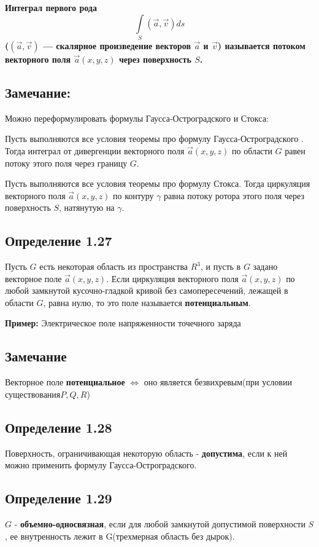 \documentclass[12pt]{article}
\begin{document}
\textbf{Интеграл первого рода}
	$$\int\limits_{S} (\vec{a} , \vec{v})ds$$
\textbf{($(\vec{a} , \vec{v})$ — скалярное произведение векторов $\vec{a}$ и $\vec{v}$) называется потоком векторного поля $\vec{a}(x, y, z)$ через поверхность $S$.}

\subsection*{Замечание:}
	Можно переформулировать формулы Гаусса-Остроградского и Стокса:
	
	Пусть выполняются все условия теоремы про формулу Гаусса-Остроградского . Тогда интеграл от дивергенции векторного поля $\vec{a}(x, y, z)$ по области $G$ равен потоку этого поля через границу $G$.


	Пусть выполняются все условия теоремы про формулу Стокса. Тогда циркуляция векторного поля $\vec{a}(x, y, z)$ по контуру $\gamma$ равна потоку ротора этого поля через поверхность $S$, натянутую на $\gamma$.
	
\subsection*{Определение 1.27}
Пусть $G$ есть некоторая область из пространства $R^3$, и пусть в $G$ задано
векторное поле $\vec{a}(x, y, z).$
Если циркуляция векторного поля $\vec{a}(x, y, z)$ по любой замкнутой кусочно-гладкой кривой без самопересечений, лежащей в области $G$, равна нулю, то это поле называется \textbf{потенциальным}.

\textbf{Пример:} Электрическое поле напряженности точечного заряда
	
\subsection*{Замечание}
	Векторное поле \textbf{потенциальное} $\Leftrightarrow$ оно является безвихревым(при условии существования$ P, Q, R$)
	
\subsection*{Определение 1.28}	
	Поверхность, ограничивающая некоторую область - \textbf{допустима}, если к ней можно применить формулу Гаусса-Остроградского.
	
\subsection*{Определение 1.29}
	$G$ - \textbf{объемно-односвязная}, если для любой замкнутой допустимой поверхности $S$, ее внутренность лежит в G(трехмерная область без дырок).
	
\end{document}
